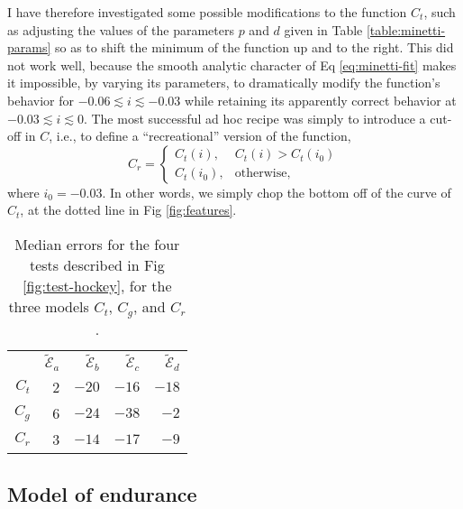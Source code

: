 \documentclass[10pt,letterpaper]{article}
\begin{document}
I have therefore investigated some possible modifications to the function
$C_t$, such as adjusting the values of the parameters $p$ and $d$
given in Table \ref{table:minetti-params} so as to shift the minimum of
the function up and to the right. This did not work well, because the smooth
analytic character of Eq \eqref{eq:minetti-fit} makes it impossible, by varying its parameters, to 
dramatically modify the function's behavior for $-0.06\lesssim i \lesssim -0.03$
while retaining its apparently correct behavior at $-0.03 \lesssim i \lesssim 0$.
The most successful ad hoc recipe was simply to introduce a cut-off in $C$, i.e.,
to define a ``recreational'' version of the function,
\begin{equation}\label{eq:rec}
  C_r =   \begin{cases}
     C_t(i), & C_t(i)>C_t(i_0) \\
     C_t(i_0), & \text{otherwise},
  \end{cases}
\end{equation}
where $i_0=-0.03$.
In other words, we simply chop the bottom off of the curve of $C_t$, at the dotted
line in Fig \ref{fig:features}.

\begin{table}[h]
\begin{tabular}{rrrrr}
       & $\widetilde{\mathcal{E}}_a$ & $\widetilde{\mathcal{E}}_b$ & $\widetilde{\mathcal{E}}_c$ & $\widetilde{\mathcal{E}}_d$  \\
$C_t$  & 2 & $-20$ & $-16$ & $-18$ \\
$C_g$  & 6 & $-24$ & $-38$ & $-2$ \\
$C_r$  & 3 & $-14$ & $-17$ & $-9$ \\
\end{tabular}
\label{table:goodness}
\caption{Median errors for the four tests described in Fig \ref{fig:test-hockey}, for the three models
$C_t$, $C_g$, and $C_r$.}
\end{table}



\subsection*{Model of endurance}
\end{document}
